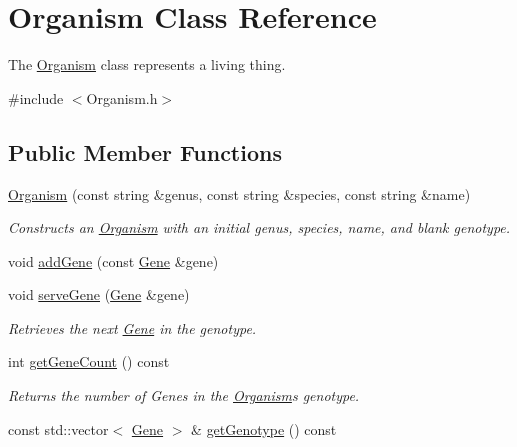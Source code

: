 \hypertarget{class_organism}{}\section{Organism Class Reference}
\label{class_organism}


The \hyperlink{class_organism}{Organism} class represents a living thing.  




{\ttfamily \#include $<$Organism.\+h$>$}

\subsection*{Public Member Functions}
\begin{DoxyCompactItemize}
\item 
\hyperlink{class_organism_a4e5d98843608364964a6616e630f9c3b}{Organism} (const string \&genus, const string \&species, const string \&name)
\begin{DoxyCompactList}\small\item\em Constructs an \hyperlink{class_organism}{Organism} with an initial genus, species, name, and blank genotype. \end{DoxyCompactList}\item 
void \hyperlink{class_organism_a3dd60a8f90366cd02ba10e32bc2aae3c}{add\+Gene} (const \hyperlink{class_gene}{Gene} \&gene)
\item 
void \hyperlink{class_organism_aa6d906d352590a2f26f40bd953245e98}{serve\+Gene} (\hyperlink{class_gene}{Gene} \&gene)
\begin{DoxyCompactList}\small\item\em Retrieves the next \hyperlink{class_gene}{Gene} in the genotype. \end{DoxyCompactList}\item 
int \hyperlink{class_organism_a9719a5a125a051c2fadffe6f4d9a8bb8}{get\+Gene\+Count} () const \hypertarget{class_organism_a9719a5a125a051c2fadffe6f4d9a8bb8}{}\label{class_organism_a9719a5a125a051c2fadffe6f4d9a8bb8}

\begin{DoxyCompactList}\small\item\em Returns the number of Genes in the \hyperlink{class_organism}{Organism}\textquotesingle{}s genotype. \end{DoxyCompactList}\item 
const std\+::vector$<$ \hyperlink{class_gene}{Gene} $>$ \& \hyperlink{class_organism_a1744d697440baff0a30a9eded7322f2a}{get\+Genotype} () const \hypertarget{class_organism_a1744d697440baff0a30a9eded7322f2a}{}\label{class_organism_a1744d697440baff0a30a9eded7322f2a}


\end{DoxyCompactItemize}
